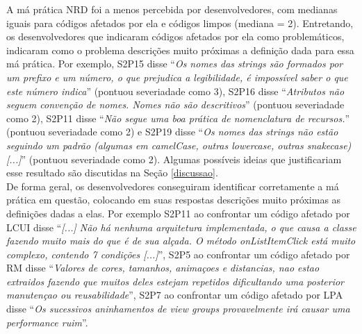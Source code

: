 A má prática NRD foi a menos percebida por desenvolvedores, com medianas iguais para códigos afetados por ela e códigos limpos (mediana = 2). Entretando, os desenvolvedores que indicaram códigos afetados por ela como problemáticos, indicaram como o problema descrições muito próximas a definição dada para essa má prática. Por exemplo, S2P15 disse ``\textit{Os nomes das strings são formados por um prefixo e um número, o que prejudica a legibilidade, é impossível saber o que este número indica}'' (pontuou severiadade como 3), S2P16 disse ``\textit{Atributos não seguem convenção de nomes. Nomes não são descritivos}'' (pontuou severiadade como 2), S2P11 disse ``\textit{Não segue uma boa prática de nomenclatura de recursos.}'' (pontuou severiadade como 2) e S2P19 disse ``\textit{Os nomes das strings não estão seguindo um padrão (algumas em camelCase, outras lowercase, outras snakecase) [...]}'' (pontuou severiadade como 2). Algumas possíveis ideias que justificariam esse resultado são discutidas na Seção \ref{discussao}. \\

De forma geral, os desenvolvedores conseguiram identificar corretamente a má prática em questão, colocando em suas respostas descrições muito próximas as definições dadas a elas. Por exemplo S2P11 ao confrontar um código afetado por LCUI disse ``\textit{[...] Não há nenhuma arquitetura implementada, o que causa a classe fazendo muito mais do que é de sua alçada. O método onListItemClick está muito complexo, contendo 7 condições [...]}'', S2P5 ao confrontar um código afetado por RM disse ``\textit{Valores de cores, tamanhos, animaçoes e distancias, nao estao extraidos fazendo que muitos deles estejam repetidos dificultando uma posterior manutençao ou reusabilidade}'', S2P7 ao confrontar um código afetado por LPA disse ``\textit{Os sucessivos aninhamentos de view groups provavelmente irá causar uma performance ruim}''.

